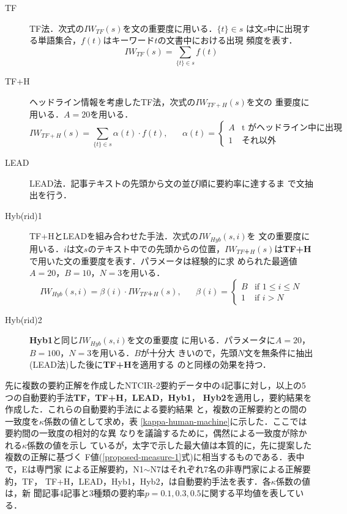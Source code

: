 \begin{description}
\item[TF] TF法．次式の$IW_{TF}(s)$を文の重要度に用いる．$\{t\} \in s$
は文$s$中に出現する単語集合，$f(t)$はキーワード$t$の文書中における出現
頻度を表す．
\begin{displaymath}
IW_{TF}(s) = \sum_{\{t\} \in s} f(t)
\end{displaymath}
\item[TF+H] ヘッドライン情報を考慮したTF法，次式の$IW_{TF+H}(s)$を文の
重要度に用いる．$A = 20$を用いる．
\begin{displaymath}
IW_{TF+H} (s) = \sum_{\{t\} \in s} \alpha (t)
\cdot f(t), \;\;\;\;\;\;
 \alpha (t) = \left \{
\begin{array}{ll}
 A & \mbox{t がヘッドライン中に出現} \\ 1 &
\mbox{それ以外} 
\end{array}
\right. 
\end{displaymath}
\item[LEAD] LEAD法．記事テキストの先頭から文の並び順に要約率に達するま
で文抽出を行う．
\item[Hyb(rid)1] TF+HとLEADを組み合わせた手法．次式の$IW_{Hyb}(s,i)$を
文の重要度に用いる．$i$は文$s$のテキスト中での先頭からの位置，$IW_{TF
＋H} (s)$は{\bf TF+H}で用いた文の重要度を表す．パラメータは経験的に求
められた最適値$A = 20$，$B = 10$，$N = 3$を用いる．
\begin{displaymath}
IW_{Hyb} (s, i) = \beta(i) \cdot IW_{TF＋H} (s), \;\;\;\;\;\;
\beta (i) = \left\{
\begin{array}{ll}
B & \mbox{if $1 \leq i \leq N$} \\
1 & \mbox{if $i > N$}
\end{array}
\right.
\end{displaymath}
\item[Hyb(rid)2] {\bf Hyb1}と同じ$IW_{Hyb}(s,i)$を文の重要度
に用いる．パラメータに$A =20$，$B = 100$，$N = 3$を用いる．$B$が十分大
きいので，先頭$N$文を無条件に抽出(LEAD法)した後に{\bf TF+H}を適用する
のと同様の効果を持つ．
\\
\end{description}

先に複数の要約正解を作成したNTCIR-2要約データ中の4記事に対し，以上の5
つの自動要約手法{\bf TF}，{\bf TF+H}，{\bf LEAD}，{\bf Hyb1}，{\bf
Hyb2}を適用し，要約結果を作成した．これらの自動要約手法による要約結果
と，複数の正解要約との間の一致度を$\kappa$係数の値として求め，表
\ref{kappa-human-machine}に示した．ここでは要約間の一致度の相対的な異
なりを議論するために，偶然による一致度が除かれる$\kappa$係数の値を示し
ているが，太字で示した最大値は本質的に，先に提案した複数の正解に基づく
F値(\ref{proposed-measure-1}式)に相当するものである．表中で，Eは専門家
による正解要約，N1$\sim$N7はそれぞれ7名の非専門家による正解要約，TF，
TF+H，LEAD，Hyb1，Hyb2，は自動要約手法を表す．各$\kappa$係数の値は，新
聞記事4記事と3種類の要約率$p=0.1, 0.3, 0.5$に関する平均値を表している．

